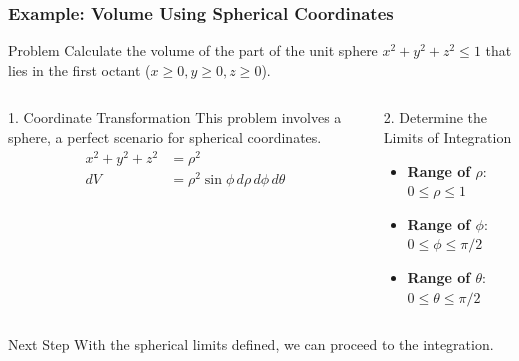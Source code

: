 \documentclass[aspectratio=169, UTF8]{beamer}
\begin{document}
\begin{frame}
    \frametitle{Example: Volume Using Spherical Coordinates}

    \begin{block}{Problem}
        Calculate the volume of the part of the unit sphere $x^2+y^2+z^2 \le 1$ that lies in the first octant ($x\ge0, y\ge0, z\ge0$).
    \end{block}

    \begin{columns}[T]
        \begin{column}{0.5\textwidth}
            \begin{block}{1. Coordinate Transformation}
                This problem involves a sphere, a perfect scenario for spherical coordinates.
                \begin{align*}
                    x^2+y^2+z^2 & = \rho^2                                       \\
                    dV          & = \rho^2 \sin\phi \, d\rho \, d\phi \, d\theta
                \end{align*}
            \end{block}
        \end{column}

        \begin{column}{0.5\textwidth}
            \begin{block}{2. Determine the Limits of Integration}
                \begin{itemize}
                    \item \textbf{Range of $\rho$}: \\ $0 \le \rho \le 1$
                    \item \textbf{Range of $\phi$}: \\ $0 \le \phi \le \pi/2$
                    \item \textbf{Range of $\theta$}: \\ $0 \le \theta \le \pi/2$
                \end{itemize}
            \end{block}
        \end{column}
    \end{columns}

    \begin{alertblock}{Next Step}
        With the spherical limits defined, we can proceed to the integration.
    \end{alertblock}

\end{frame}
\end{document}
